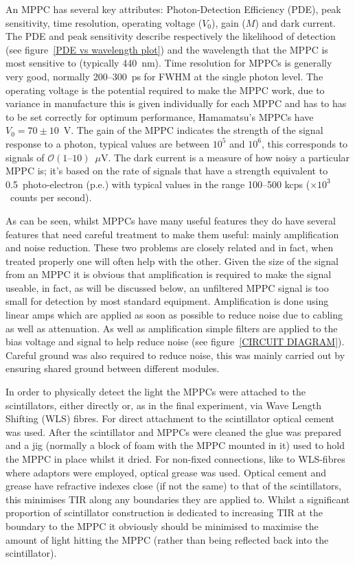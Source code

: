 An MPPC has several key attributes: Photon-Detection Efficiency (PDE), peak sensitivity, time resolution, operating voltage (\( V_0 \)), gain (\( M \)) and dark current. The PDE and peak sensitivity describe respectively the likelihood of detection (see figure~\ref{PDE vs wavelength plot}) and the wavelength that the MPPC is most sensitive to (typically 440~nm). Time resolution for MPPCs is generally very good, normally 200--300~ps for FWHM at the single photon level. The operating voltage is the potential required to make the MPPC work, due to variance in manufacture this is given individually for each MPPC and has to has to be set correctly for optimum performance, Hamamatsu's MPPCs have \( V_0 = 70\pm10 \)~V. The gain of the MPPC indicates the strength of the signal response to a photon, typical values are between \( 10^5 \) and \( 10^6 \), this corresponds to signals of \( \mathcal{O}(1\text{--}10) \)~\(\mu\)V. The dark current is a measure of how noisy a particular MPPC is; it's based on the rate of signals that have a strength equivalent to 0.5~photo-electron (p.e.) with typical values in the range 100--500 kcps (\( \times10^3 \)~counts per second).

As can be seen, whilst MPPCs have many useful features they do have several features that need careful treatment to make them useful: mainly amplification and noise reduction. These two problems are closely related and in fact, when treated properly one will often help with the other. Given the size of the signal from an MPPC it is obvious that amplification is required to make the signal useable, in fact, as will be discussed below, an unfiltered MPPC signal is too small for detection by most standard equipment. Amplification is done using linear amps which are applied as soon as possible to reduce noise due to cabling as well as attenuation. As well as amplification simple filters are applied to the bias voltage and signal to help reduce noise (see figure~\ref{CIRCUIT DIAGRAM}). Careful ground was also required to reduce noise, this was mainly carried out by ensuring shared ground between different modules.

In order to physically detect the light the MPPCs were attached to the scintillators, either directly or, as in the final experiment, via Wave Length Shifting (WLS) fibres. For direct attachment to the scintillator optical cement was used. After the scintillator and MPPCs were cleaned the glue was prepared and a jig (normally a block of foam with the MPPC mounted in it) used to hold the MPPC in place whilst it dried. For non-fixed connections, like to WLS-fibres where adaptors were employed, optical grease was used. Optical cement and grease have refractive indexes close (if not the same) to that of the scintillators, this minimises TIR along any boundaries they are applied to. Whilst a significant proportion of scintillator construction is dedicated to increasing TIR at the boundary to the MPPC it obviously should be minimised to maximise the amount of light hitting the MPPC (rather than being reflected back into the scintillator).

